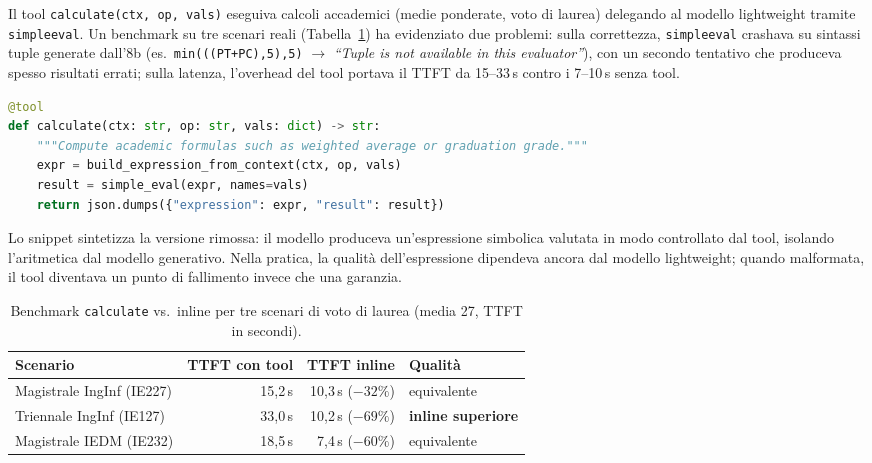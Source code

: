 \documentclass[11pt,a4paper]{article}
\newcommand{\code}[1]{\texttt{\small#1}}
\begin{document}
\newpage
Il tool \code{calculate(ctx, op, vals)} eseguiva calcoli accademici (medie ponderate, voto
di laurea) delegando al modello lightweight tramite \texttt{simpleeval}. Un benchmark su
tre scenari reali (Tabella~\ref{tab:calc_bench}) ha evidenziato due problemi: sulla
correttezza, \texttt{simpleeval} crashava su sintassi tuple generate dall'8b (es.\
\texttt{min(((PT+PC),5),5)} $\to$ \textit{``Tuple is not available in this evaluator''}),
con un secondo tentativo che produceva spesso risultati errati; sulla latenza, l'overhead
del tool portava il TTFT da 15--33\,s contro i 7--10\,s senza tool.

\begin{lstlisting}[language=Python, caption={Schema della prima implementazione del tool \texttt{calculate}: valutazione controllata di espressioni aritmetiche generate dal modello lightweight.}]
@tool
def calculate(ctx: str, op: str, vals: dict) -> str:
    """Compute academic formulas such as weighted average or graduation grade."""
    expr = build_expression_from_context(ctx, op, vals)
    result = simple_eval(expr, names=vals)
    return json.dumps({"expression": expr, "result": result})
\end{lstlisting}

Lo snippet sintetizza la versione rimossa: il modello produceva un'espressione simbolica
valutata in modo controllato dal tool, isolando l'aritmetica dal modello generativo. Nella
pratica, la qualità dell'espressione dipendeva ancora dal modello lightweight; quando
malformata, il tool diventava un punto di fallimento invece che una garanzia.

\begin{table}[htbp]
\centering
\caption{Benchmark \texttt{calculate} vs.\ inline per tre scenari di voto di laurea
         (media 27, TTFT in secondi).}
\label{tab:calc_bench}
\small
\begin{tabular}{lrrl}
\toprule
\textbf{Scenario} & \textbf{TTFT con tool} & \textbf{TTFT inline} & \textbf{Qualità} \\
\midrule
Magistrale IngInf (IE227) & 15,2\,s & 10,3\,s ($-32\%$) & equivalente \\
Triennale IngInf (IE127)  & 33,0\,s & 10,2\,s ($-69\%$) & \textbf{inline superiore} \\
Magistrale IEDM (IE232)   & 18,5\,s & \phantom{0}7,4\,s ($-60\%$) & equivalente \\
\bottomrule
\end{tabular}
\end{table}
\end{document}
